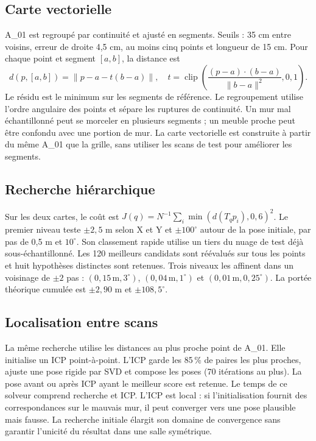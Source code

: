 \documentclass[11pt,a4paper]{article}
\begin{document}
\subsection{Carte vectorielle}
A\_01 est regroupé par continuité et ajusté en segments. Seuils : 35 cm entre
voisins, erreur de droite 4,5 cm, au moins cinq points et longueur de 15 cm.
Pour chaque point et segment $[a,b]$, la distance est
\[
d(p,[a,b])=\|p-a-t(b-a)\|,\quad
t=\operatorname{clip}\left(\frac{(p-a)\cdot(b-a)}{\|b-a\|^2},0,1\right).
\]
Le résidu est le minimum sur les segments de référence.
Le regroupement utilise l'ordre angulaire des points et sépare les ruptures
de continuité. Un mur mal échantillonné peut se morceler en plusieurs
segments ; un meuble proche peut être confondu avec une portion de mur.
La carte vectorielle est construite à partir du même A\_01 que la grille,
sans utiliser les scans de test pour améliorer les segments.

\subsection{Recherche hiérarchique}
Sur les deux cartes, le coût est
$J(q)=N^{-1}\sum_i\min(d(T_qp_i),0{,}6)^2$.
Le premier niveau teste $\pm2{,}5$ m selon X et Y et $\pm100^\circ$
autour de la pose initiale, par pas de 0,5 m et $10^\circ$. Son classement
rapide utilise un tiers du nuage de test déjà sous-échantillonné. Les 120
meilleurs candidats sont réévalués sur tous les points et huit hypothèses
distinctes sont retenues. Trois niveaux les affinent dans un voisinage de
$\pm2$ pas : $(0{,}15\,\mathrm m,3^\circ)$,
$(0{,}04\,\mathrm m,1^\circ)$ et $(0{,}01\,\mathrm m,0{,}25^\circ)$.
La portée théorique cumulée est $\pm2{,}90$ m et $\pm108{,}5^\circ$.

\subsection{Localisation entre scans}
La même recherche utilise les distances au plus proche point de A\_01. Elle
initialise un ICP point-à-point. L'ICP garde les 85\,\% de paires les plus
proches, ajuste une pose rigide par SVD et compose les poses (70 itérations
au plus). La pose avant ou après ICP ayant le meilleur score est retenue.
Le temps de ce solveur comprend recherche et ICP.
L'ICP est local : si l'initialisation fournit des correspondances sur le
mauvais mur, il peut converger vers une pose plausible mais fausse.
La recherche initiale élargit son domaine de convergence sans garantir
l'unicité du résultat dans une salle symétrique.
\end{document}
